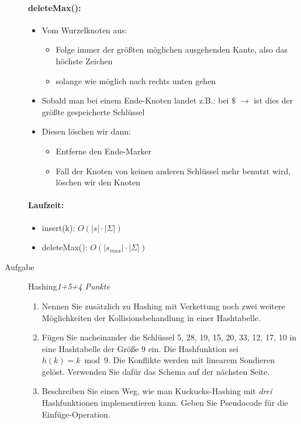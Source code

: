 \documentclass[a4paper,twoside,12pt]{article}
\newcounter{AUFGNR}
\newcommand{\AUFGABE}[2]{\vspace{0.3cm}\item[Aufgabe \arabic{AUFGNR}]\stepcounter{AUFGNR} #1\hfill\emph{#2}}
\begin{document}
\begin{description}
\paragraph{deleteMax():}
\begin{itemize}
	\item Vom Wurzelknoten aus:
	\begin{itemize}
		\item Folge immer der größten möglichen ausgehenden Kante, also das höchste Zeichen
		\item solange wie möglich nach rechts unten gehen
	\end{itemize}
	\item Sobald man bei einem Ende-Knoten landet z.B.: bei $\$$ $\rightarrow$ ist dies der größte gespeicherte Schlüssel
	\item Diesen löschen wir dann:
	\begin{itemize}
		\item Entferne den Ende-Marker
		\item Fall der Knoten von keinen anderen Schlüssel mehr benutzt wird, löschen wir den Knoten
	\end{itemize}
\end{itemize}

\paragraph{Laufzeit:}
\begin{itemize}
	\item insert(k): $O(|s| \cdot |\Sigma|)$
	\item deleteMax(): $O(|s_{max}| \cdot |\Sigma|)$
\end{itemize}

\newpage
\AUFGABE{Hashing}{1+5+4 Punkte}

\begin{enumerate}
\item Nennen Sie zusätzlich zu Hashing mit Verkettung noch zwei
  weitere Möglichkeiten der Kollisionsbehandlung in einer Hashtabelle.
\item
    Fügen Sie nacheinander die Schlüssel 5, 28, 19, 15, 20, 33, 12, 17, 10
    in eine Hashtabelle der Größe 9 ein. Die Hashfunktion sei
    $h(k) = k \bmod 9$. Die Konflikte werden mit linearem Sondieren
		gelöst. Verwenden Sie dafür das Schema auf der nächsten Seite.
\item
Beschreiben Sie einen Weg, wie man Kuckucks-Hashing mit \emph{drei}
Hashfunktionen implementieren kann. Geben Sie Pseudocode für
die Einfüge-Operation.
\end{enumerate}


\end{description}
\end{document}
